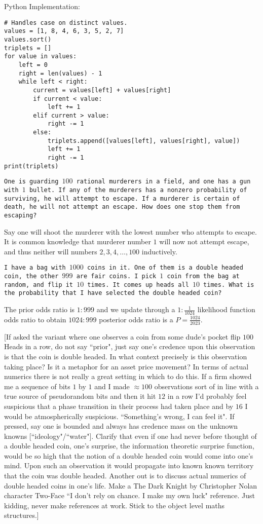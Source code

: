 Python Implementation:

\begin{verbatim}
# Handles case on distinct values.
values = [1, 8, 4, 6, 3, 5, 2, 7]
values.sort()
triplets = []
for value in values:
    left = 0
    right = len(values) - 1
    while left < right:
        current = values[left] + values[right]
        if current < value:
            left += 1
        elif current > value:
            right -= 1
        else:
            triplets.append([values[left], values[right], value])
            left += 1
            right -= 1
print(triplets)
\end{verbatim}

\texttt{One is guarding $100$ rational murderers in a field, and one has a gun with $1$ bullet. If any of the murderers has a nonzero probability of surviving, he will attempt to escape. If a murderer is certain of death, he will not attempt an escape. How does one stop them from escaping?}

Say one will shoot the murderer with the lowest number who attempts to escape. It is common knowledge that murderer number $1$ will now not attempt escape, and thus neither will numbers $2,3,4,\dots,100$ inductively.

\texttt{I have a bag with $1000$ coins in it. One of them is a double headed coin, the other $999$ are fair coins. I pick $1$ coin from the bag at random, and flip it $10$ times. It comes up heads all $10$ times. What is the probability that I have selected the double headed coin?}

The prior odds ratio is $1:999$ and we update through a $1:\frac{1}{1024}$ likelihood function odds ratio to obtain $1024:999$ posterior odds ratio is a $P=\boxed{\frac{1024}{2023}}$.

[If asked the variant where one observes a coin from some dude's pocket flip $100$ Heads in a row, do not say ``prior", just say one's credence upon this observation is that the coin is double headed. In what context precisely is this observation taking place? Is it a metaphor for an asset price movement? In terms of actual numerics there is not really a great setting in which to do this. If a firm showed me a sequence of bits $1$ by $1$ and I made $\approx 100$ observations sort of in line with a true source of pseudorandom bits and then it hit $12$ in a row I'd probably feel suspicious that a phase transition in their process had taken place and by $16$ I would be atmospherically suspicious. ``Something's wrong, I can feel it". If pressed, say one is bounded and always has credence mass on the unknown knowns [``ideology"/``water"]. Clarify that even if one had never before thought of a double headed coin, one's surprise, the information theoretic surprise function, would be so high that the notion of a double headed coin would come into one's mind. Upon such an observation it would propagate into known known territory that the coin was double headed. Another out is to discuss actual numerics of double headed coins in one's life. Make a The Dark Knight by Christopher Nolan character Two-Face ``I don't rely on chance. I make my own luck" reference. Just kidding, never make references at work. Stick to the object level maths structures.]

